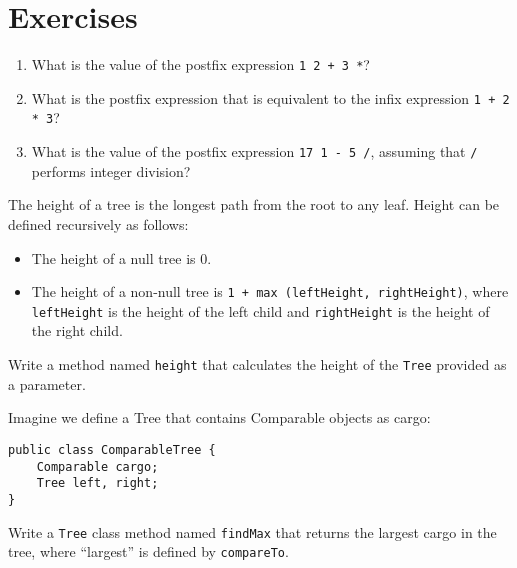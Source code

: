 \section{Exercises}

\begin{exercise}
\begin{enumerate}

\item What is the value of the postfix expression 
{\tt 1 2 + 3 *}?

\item What is the postfix expression that is equivalent to
the infix expression {\tt 1 + 2 * 3}?

\item What is the value of the postfix expression 
{\tt 17 1 - 5 /}, assuming that {\tt /} performs integer division? 

\end{enumerate}
\end{exercise}


\begin{exercise}
\label{ex.height}
The height of a tree is the longest path from the root to
any leaf.  Height can be defined recursively as follows:

\begin{itemize}

\item The height of a null tree is 0.

\item The height of a non-null tree is {\tt 1 + max (leftHeight, rightHeight)},
where {\tt leftHeight} is the height of the left child and {\tt rightHeight}
is the height of the right child.

\end{itemize}

Write a method named {\tt height} that calculates the height of
the {\tt Tree} provided as a parameter.
\end{exercise}


\begin{exercise}
Imagine we define a Tree that contains Comparable objects as
cargo:

\begin{verbatim}
public class ComparableTree {
    Comparable cargo;
    Tree left, right;
}
\end{verbatim}

Write a {\tt Tree} class method named {\tt findMax}
that returns the largest cargo in
the tree, where ``largest'' is defined by {\tt compareTo}.
\end{exercise}


